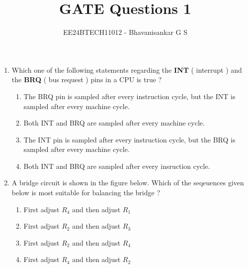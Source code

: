 \documentclass[journal,12pt,onecolumn]{IEEEtran}
\theoremstyle{remark}
\begin{document}

\vspace{3cm}

\title{GATE Questions 1}
\author{EE24BTECH11012 - Bhavanisankar G S}
\maketitle
\newpage
\bigskip

\renewcommand{\thefigure}{\theenumi}
\renewcommand{\thetable}{\theenumi}
\begin{enumerate}
	\item Which one of the following statements regarding the \textbf{INT} ( interrupt ) and the \textbf{BRQ} ( bus request ) pins in a CPU is true ?
	\begin{enumerate}
		\item The BRQ pin is sampled after every instruction cycle, but the INT is sampled after every machine cycle.
		\item Both INT and BRQ are sampled after every machine cycle.
		\item The INT pin is sampled after every instruction cycle, but the BRQ is sampled after every machine cycle.
		\item Both INT and BRQ are sampled after every insruction cycle.
		\end{enumerate}
	\item A bridge circuit is shown in the figure below. Which of the seqeuences given below is most suitable for balancing the bridge ?
		
		\begin{enumerate}
			\item First adjust $R_4$ and then adjust $R_1$
			\item First adjust $R_2$ and then adjust $R_3$
			\item First adjust $R_2$ and then adjust $R_4$
			\item First adjust $R_4$ and then adjust $R_2$
		\end{enumerate}	
\end{enumerate}
\end{document}
